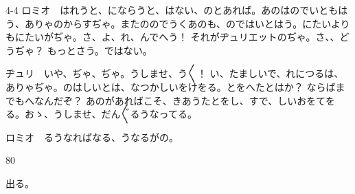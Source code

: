 \documentclass[tate,paper=b6j,jafontsize=9pt]{jlreq}
\begin{document}
\begin{azconvIndented}{4\zw}{-4\zw}
ロミオ　はれうと、にならうと、はない、のとあれば。あのはのでいともはう、ありゃのからすぢゃ。またののでうくあのも、のではいとはう。にたいよりもにたいがぢゃ。さ、よ、れ、んでへう！ それがヂュリエットのぢゃ。さ、、どうぢゃ？ もっとさう。ではない。

ヂュリ　いや、ぢゃ、ぢゃ。うしませ、う{〳〵}！ い、たましいで、れにつるは、ありゃぢゃ。のはしいとは、なつかしいをけをる。とをへたとはか？ ならばまでもへなんだぞ？ あのがあればこそ、きあうたとをし、すで、しいおをてをる。おゝ、うしませ、だん{〴〵}るうなってる。

ロミオ　るうなればなる、うなるがの。

\end{azconvIndented}
\begin{azconvIndented}{8\zw}{0\zw}

出る。

\end{azconvIndented}
\end{document}
